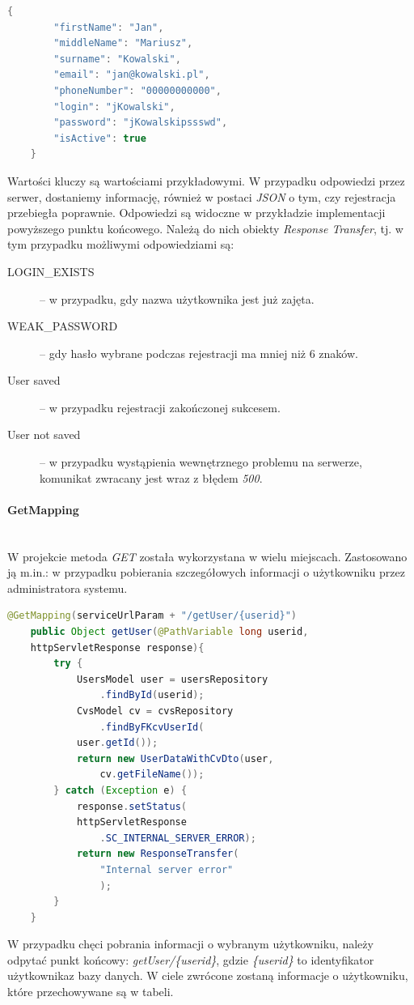 \documentclass[twoside]{projektInzynierskiMS}
\numberwithin{figure}{section}
\begin{document}
\begin{lstlisting}[language=Java,caption=Przykładowy obiekt JSON wysyłany w celu rejestracji użytkownika. Źródło: Opracowanie własne.,captionpos=b]
    {
        "firstName": "Jan",
        "middleName": "Mariusz",
        "surname": "Kowalski",
        "email": "jan@kowalski.pl",
        "phoneNumber": "00000000000",
        "login": "jKowalski",
        "password": "jKowalskipssswd",
        "isActive": true
    }
\end{lstlisting}
Wartości kluczy są wartościami przykładowymi. W przypadku odpowiedzi przez serwer, dostaniemy informację, również w postaci \textit{JSON} o tym, czy rejestracja przebiegła poprawnie. Odpowiedzi są widoczne w przykładzie implementacji powyższego punktu końcowego. Należą do nich obiekty \textit{Response Transfer}, tj. w tym przypadku możliwymi odpowiedziami są:
\begin{description}
    \item[LOGIN\_EXISTS] – w przypadku, gdy nazwa użytkownika jest już zajęta.
    \item[WEAK\_PASSWORD] – gdy hasło wybrane podczas rejestracji ma mniej niż 6 znaków.
    \item[User saved] – w przypadku rejestracji zakończonej sukcesem.
    \item[User not saved] – w przypadku wystąpienia wewnętrznego problemu na serwerze, komunikat zwracany jest wraz z błędem \textit{500}.
\end{description}

\paragraph{GetMapping}
\mbox{} \\ \indent
W projekcie metoda \textit{GET} została wykorzystana w wielu miejscach. Zastosowano ją m.in.: w przypadku pobierania szczegółowych informacji o użytkowniku przez administratora systemu.

\begin{lstlisting}[language=Java,caption=Wykorzystanie metody GET na przykładzie funkcji zwracającej danego użytkownika. Źródło: Opracowanie własne.,captionpos=b]
    @GetMapping(serviceUrlParam + "/getUser/{userid}")
    public Object getUser(@PathVariable long userid,
    httpServletResponse response){
        try {
            UsersModel user = usersRepository
                .findById(userid);
            CvsModel cv = cvsRepository
                .findByFKcvUserId(
            user.getId());
            return new UserDataWithCvDto(user, 
                cv.getFileName());
        } catch (Exception e) {
            response.setStatus(
            httpServletResponse
                .SC_INTERNAL_SERVER_ERROR);
            return new ResponseTransfer(
                "Internal server error"
                );
        }
    }
\end{lstlisting}
W przypadku chęci pobrania informacji o wybranym użytkowniku, należy odpytać punkt końcowy: \textit{getUser/\{userid\}}, gdzie \textit{\{userid\}} to identyfikator użytkownika\linebreak z bazy danych. W ciele zwrócone zostaną informacje o użytkowniku, które przechowywane są w tabeli.
\end{document}
